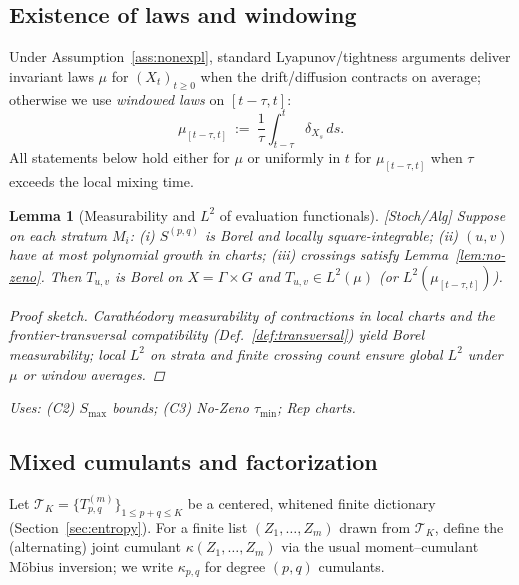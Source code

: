 \documentclass[10pt]{article}
\newcommand{\uses}[1]{\par\smallskip\noindent\textit{Uses: }#1\par\smallskip}
\newenvironment{proofsketch}{\begin{proof}[Proof sketch]}{\end{proof}}
\newtheorem{lemma}{Lemma}
\begin{document}
\subsection{Existence of laws and windowing}

Under Assumption~\ref{ass:nonexpl}, standard Lyapunov/tightness arguments deliver invariant laws $\mu$ for $(X_t)_{t\ge0}$ when the drift/diffusion contracts on average; otherwise we use \emph{windowed laws} on $[t-\tau,t]$:
\[
\mu_{[t-\tau,t]}\ :=\ \frac{1}{\tau}\int_{t-\tau}^{t}\delta_{X_s}\,ds.
\]
All statements below hold either for $\mu$ or uniformly in $t$ for $\mu_{[t-\tau,t]}$ when $\tau$ exceeds the local mixing time.

\begin{lemma}[Measurability and $L^2$ of evaluation functionals]\label{lem:meas-3}
\emph{[\textup{Stoch/Alg}]} Suppose on each stratum $M_i$: (i) $S^{(p,q)}$ is Borel and locally square-integrable; (ii) $(u,v)$ have at most polynomial growth in charts; (iii) crossings satisfy Lemma~\ref{lem:no-zeno}. Then $T_{u,v}$ is Borel on $X=\Gamma\times G$ and $T_{u,v}\in L^2(\mu)$ (or $L^2(\mu_{[t-\tau,t]})$).
\begin{proofsketch}
Carathéodory measurability of contractions in local charts and the frontier-transversal compatibility (Def.~\ref{def:transversal}) yield Borel measurability; local $L^2$ on strata and finite crossing count ensure global $L^2$ under $\mu$ or window averages.
\end{proofsketch}
\uses{(C2) $S_{\max}$ bounds; (C3) No-Zeno $\tau_{\min}$; Rep charts.}
\end{lemma}

\subsection{Mixed cumulants and factorization}\label{subsec:cumulants}

Let $\mathcal T_K=\{T^{(m)}_{p,q}\}_{1\le p+q\le K}$ be a centered, whitened finite dictionary (Section~\ref{sec:entropy}). For a finite list $(Z_1,\ldots,Z_m)$ drawn from $\mathcal T_K$, define the (alternating) joint cumulant $\kappa(Z_1,\ldots,Z_m)$ via the usual moment–cumulant Möbius inversion; we write $\kappa_{p,q}$ for degree $(p,q)$ cumulants.
\end{document}
